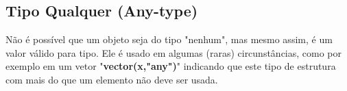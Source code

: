     \subsection{Tipo Qualquer (Any-type)}
      Não é possível que um objeto seja do tipo "nenhum", mas mesmo assim, é um valor válido para tipo. Ele é usado em algumas (raras) circunstâncias, como por exemplo em um vetor "\textbf{vector(x,"any")}" indicando que este tipo de estrutura com mais do que um elemento não deve ser usada.
        
      \begin{comment} 
        \subsection{Objetos da Linguagem}
          Existem três tipos de objetos que constituem a linguagem R. Elas são: chamadas (calls), expressões (expressions), e nomes (names). Expressões que são sintaticamente corretas são chamadas de afirmações (statements).
        \subsection{Objeto Vetor}
          Vetores podem ser entendidos como células adjacentes que contém dados. Essas células podem ser acessadas a partir de um índice, tal qual x[5]. R tem 6 tipos básicos de vetores atômicos: lógico, inteiro, real, complexo, string (ou caractere) e cru (raw).
        \subsection{Objeto Expressão}
          Em R, pode-se ter objetos do tipo "expression". Uma expressão contém uma ou mais instruções. Uma declaração é uma coleção sintaticamente correta de tokens. Os objetos de expressão são objetos de linguagem especial que contêm instruções R analisadas, mas não avaliadas. A principal diferença é que um objeto de expressão pode conter várias dessas expressões. Outra diferença mais sutil é que os objetos do tipo "expression" são apenas avaliado quando explicitamente passado para eval, enquanto outros objetos de linguagem podem ser avaliados em alguns casos inesperados.
          Um objeto de expressão se comporta de maneira muito semelhante a uma lista e seus componentes devem ser acessados da mesma forma que os componentes de uma lista.

\end{comment}
